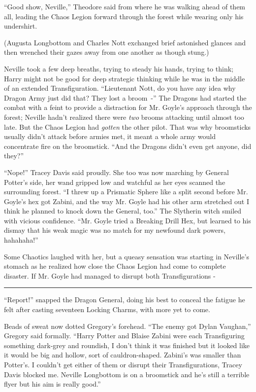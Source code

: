 ``Good show, Neville,'' Theodore said from where he was walking ahead of them all, leading the Chaos Legion forward through the forest while wearing only his undershirt.

(Augusta Longbottom and Charles Nott exchanged brief astonished glances and then wrenched their gazes away from one another as though stung.)

Neville took a few deep breaths, trying to steady his hands, trying to think; Harry might not be good for deep strategic thinking while he was in the middle of an extended Transfiguration. ``Lieutenant Nott, do you have any idea why Dragon Army just did that? They lost a broom~-'' The Dragons had started the combat with a feint to provide a distraction for Mr. Goyle's approach through the forest; Neville hadn't realized there were \emph{two} brooms attacking until almost too late. But the Chaos Legion had \emph{gotten} the other pilot. That was why broomsticks usually didn't attack before armies met, it meant a whole army would concentrate fire on the broomstick. ``And the Dragons didn't even get anyone, did they?''

``Nope!'' Tracey Davis said proudly. She too was now marching by General Potter's side, her wand gripped low and watchful as her eyes scanned the surrounding forest. ``I threw up a Prismatic Sphere like a split second before Mr. Goyle's hex got Zabini, and the way Mr. Goyle had his other arm stretched out I think he planned to knock down the General, too.'' The Slytherin witch smiled with vicious confidence. ``Mr. Goyle tried a Breaking Drill Hex, but learned to his dismay that his weak magic was no match for my newfound dark powers, hahahaha!''

Some Chaotics laughed with her, but a queasy sensation was starting in Neville's stomach as he realized how close the Chaos Legion had come to complete disaster. If Mr. Goyle had managed to disrupt both Transfigurations -

\begin{center}\rule{3in}{0.4pt}\end{center}

``Report!'' snapped the Dragon General, doing his best to conceal the fatigue he felt after casting seventeen Locking Charms, with more yet to come.

Beads of sweat now dotted Gregory's forehead. ``The enemy got Dylan Vaughan,'' Gregory said formally. ``Harry Potter and Blaise Zabini were each Transfiguring something dark-grey and roundish, I don't think it was finished but it looked like it would be big and hollow, sort of cauldron-shaped. Zabini's was smaller than Potter's. I couldn't get either of them or disrupt their Transfigurations, Tracey Davis blocked me. Neville Longbottom is on a broomstick and he's still a terrible flyer but his aim is really good.''

